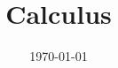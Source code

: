 \documentclass[11pt,twoside=semi,openright,numbers=noenddot]{scrbook}
\begin{document}
\frontmatter

\title{Calculus}
\date{\today}
\maketitle

\tableofcontents

\mainmatter
\end{document}
